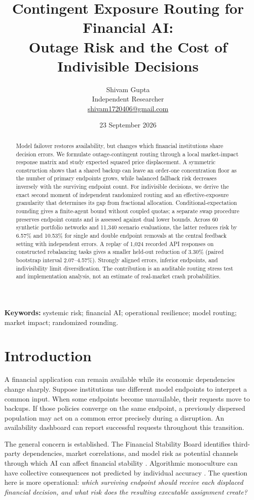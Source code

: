 \documentclass[11pt]{article}
\title{\vspace{-1em}\textbf{Contingent Exposure Routing for Financial AI:}\\
Outage Risk and the Cost of Indivisible Decisions}
\author{Shivam Gupta\\
\small Independent Researcher\\
\small \href{mailto:shivam1720406@gmail.com}{shivam1720406@gmail.com}}
\date{23 September 2026}
\begin{document}
\maketitle
\begin{abstract}
Model failover restores availability, but changes which financial institutions share decision errors. We formulate outage-contingent routing through a local market-impact response matrix and study expected squared price displacement. A symmetric construction shows that a shared backup can leave an order-one concentration floor as the number of primary endpoints grows, while balanced fallback risk decreases inversely with the surviving endpoint count. For indivisible decisions, we derive the exact second moment of independent randomized routing and an effective-exposure granularity that determines its gap from fractional allocation. Conditional-expectation rounding gives a finite-agent bound without coupled quotas; a separate swap procedure preserves endpoint counts and is assessed against dual lower bounds. Across 60 synthetic portfolio networks and 11,340 scenario evaluations, the latter reduces risk by 6.57\% and 10.53\% for single and double endpoint removals at the central feedback setting with independent errors. A replay of 1,024 recorded API responses on constructed rebalancing tasks gives a smaller held-out reduction of 3.30\% (paired bootstrap interval 2.07--4.57\%). Strongly aligned errors, inferior endpoints, and indivisibility limit diversification. The contribution is an auditable routing stress test and implementation analysis, not an estimate of real-market crash probabilities.
\end{abstract}
\noindent\textbf{Keywords:} systemic risk; financial AI; operational resilience; model routing; market impact; randomized rounding.

\section{Introduction}
A financial application can remain available while its economic dependencies change sharply. Suppose institutions use different model endpoints to interpret a common input. When some endpoints become unavailable, their requests move to backups. If those policies converge on the same endpoint, a previously dispersed population may act on a common error precisely during a disruption. An availability dashboard can report successful requests throughout this transition.

The general concern is established. The Financial Stability Board identifies third-party dependencies, market correlations, and model risk as potential channels through which AI can affect financial stability \citep{fsb2024}. Algorithmic monoculture can have collective consequences not predicted by individual accuracy \citep{kleinberg2021}. The question here is more operational: \emph{which surviving endpoint should receive each displaced financial decision, and what risk does the resulting executable assignment create?}
\end{document}
